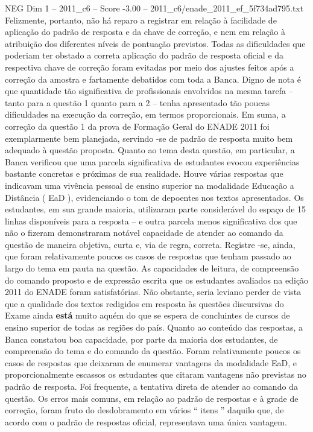\begin{textsample}{NEG Dim 1 – 2011\_c6 – Score -3.00 – 2011\_c6/enade\_2011\_ef\_5f734ad795.txt}
Felizmente, portanto, não há reparo a registrar em relação à facilidade de aplicação do padrão de resposta e da chave de correção, e nem em relação à atribuição dos diferentes níveis de pontuação previstos.
Todas as dificuldades que poderiam ter obstado a correta aplicação do padrão de resposta oficial e da respectiva chave de correção foram evitadas por meio dos ajustes feitos após a correção da amostra e fartamente debatidos com toda a Banca.
Digno de nota é que quantidade tão significativa de profissionais envolvidos na mesma tarefa – tanto para a questão 1 quanto para a 2 – tenha apresentado tão poucas dificuldades na execução da correção, em termos proporcionais.
Em suma, a correção da questão 1 da prova de Formação Geral do ENADE 2011 foi exemplarmente bem planejada, servindo -se de padrão de resposta muito bem adequado à questão proposta.
Quanto ao tema desta questão, em particular, a Banca verificou que uma parcela significativa de estudantes evocou experiências bastante concretas e próximas de sua realidade.
Houve várias respostas que indicavam uma vivência pessoal de ensino superior na modalidade Educação a Distância ( EaD ), evidenciando o tom de depoentes nos textos apresentados.
Os estudantes, em sua grande maioria, utilizaram parte considerável do espaço de 15 linhas disponíveis para a resposta – e outra parcela menos significativa dos que não o fizeram demonstraram notável capacidade de atender ao comando da questão de maneira objetiva, curta e, via de regra, correta.
Registre -se, ainda, que foram relativamente poucos os casos de respostas que tenham passado ao largo do tema em pauta na questão.
As capacidades de leitura, de compreensão do comando proposto e de expressão escrita que os estudantes avaliados na edição 2011 do ENADE foram satisfatórias.
Não obstante, seria leviano perder de vista que a qualidade dos textos redigidos em resposta às questões discursivas do Exame ainda \textbf{está} muito aquém do que se espera de concluintes de cursos de ensino superior de todas as regiões do país.
Quanto ao conteúdo das respostas, a Banca constatou boa capacidade, por parte da maioria dos estudantes, de compreensão do tema e do comando da questão.
Foram relativamente poucos os casos de respostas que deixaram de enumerar vantagens da modalidade EaD, e proporcionalmente escassos os estudantes que citaram vantagens não previstas no padrão de resposta.
Foi frequente, a tentativa direta de atender ao comando da questão.
Os erros mais comuns, em relação ao padrão de respostas e à grade de correção, foram fruto do desdobramento em vários “ itens ” daquilo que, de acordo com o padrão de respostas oficial, representava uma única vantagem.

\end{textsample}
